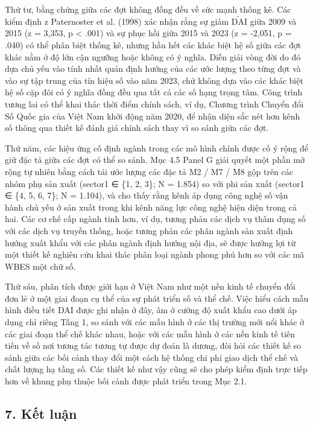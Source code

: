 \documentclass[12pt,a4paper]{article}
\begin{document}
Thứ tư, bằng chứng giữa các đợt không đồng đều về sức mạnh thống kê. Các
kiểm định z Paternoster et al. (1998) xác nhận rằng sự giảm
\(\tilde{\mathrm{DAI}}\) giữa 2009 và 2015 (z = 3,353, p \textless{}
.001) và sự phục hồi giữa 2015 và 2023 (z = -2,051, p = .040) có thể
phân biệt thống kê, nhưng hầu hết các khác biệt hệ số giữa các đợt khác
nằm ở độ lớn cận ngưỡng hoặc không có ý nghĩa. Diễn giải vòng đời do đó
dựa chủ yếu vào tính nhất quán định hướng của các ước lượng theo từng
đợt và vào sự tập trung của tín hiệu số vào năm 2023, chứ không dựa vào
các khác biệt hệ số cặp đôi có ý nghĩa đồng đều qua tất cả các số hạng
trọng tâm. Công trình tương lai có thể khai thác thời điểm chính sách,
ví dụ, Chương trình Chuyển đổi Số Quốc gia của Việt Nam khởi động năm
2020, để nhận diện sắc nét hơn kênh số thông qua thiết kế đánh giá chính
sách thay vì so sánh giữa các đợt.

Thứ năm, các hiệu ứng cố định ngành trong các mô hình chính được cố ý
rộng để giữ đặc tả giữa các đợt có thể so sánh. Mục 4.5 Panel G giải
quyết một phần mở rộng tự nhiên bằng cách tái ước lượng các đặc tả M2 /
M7 / M8 gộp trên các nhóm phụ sản xuất (sector1 ∈ \{1, 2, 3\}; N =
1.854) so với phi sản xuất (sector1 ∈ \{4, 5, 6, 7\}; N = 1.104), và cho
thấy rằng kênh áp dụng công nghệ số vận hành chủ yếu ở sản xuất trong
khi kênh năng lực công nghệ hiện diện trong cả hai. Các cơ chế cấp ngành
tinh hơn, ví dụ, tương phản các dịch vụ thâm dụng số với các dịch vụ
truyền thống, hoặc tương phản các phân ngành sản xuất định hướng xuất
khẩu với các phân ngành định hướng nội địa, sẽ được hưởng lợi từ một
thiết kế nghiên cứu khai thác phân loại ngành phong phú hơn so với các
mã WBES một chữ số.

Thứ sáu, phân tích được giới hạn ở Việt Nam như một nền kinh tế chuyển
đổi đơn lẻ ở một giai đoạn cụ thể của sự phát triển số và thể chế. Việc
hiểu cách mẫu hình điều tiết DAI được ghi nhận ở đây, âm ở cường độ xuất
khẩu cao dưới áp dụng chỉ riêng Tầng 1, so sánh với các mẫu hình ở các
thị trường mới nổi khác ở các giai đoạn thể chế khác nhau, hoặc với các
mẫu hình ở các nền kinh tế tiên tiến về số nơi tương tác tương tự được
dự đoán là dương, đòi hỏi các thiết kế so sánh giữa các bối cảnh thay
đổi một cách hệ thống chi phí giao dịch thể chế và chất lượng hạ tầng
số. Các thiết kế như vậy cũng sẽ cho phép kiểm định trực tiếp hơn về
khung phụ thuộc bối cảnh được phát triển trong Mục 2.1.

\hypertarget{7-kux1ebft-luux1eadn}{%
\subsection{7. Kết luận}\label{7-kux1ebft-luux1eadn}}
\end{document}
